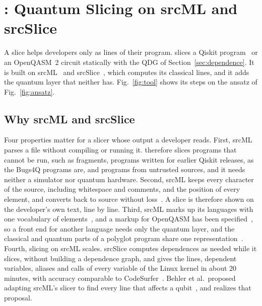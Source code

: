 \section{\tool: Quantum Slicing on srcML and srcSlice}\label{sec:tool}

A slice helps developers only as lines of their program. \tool{} slices a Qiskit
program~\cite{javadi2024qiskit} or an OpenQASM~2 circuit statically with the QDG of Section~\ref{sec:dependence}. It is built on
srcML~\cite{collard2011lightweight, collard2013srcml} and srcSlice~\cite{alomari2014srcslice}, which
computes its classical lines, and it adds the quantum layer that neither has. Fig.~\ref{fig:tool} shows its steps on the ansatz of
Fig.~\ref{fig:ansatz}.

\subsection{Why srcML and srcSlice}
Four properties matter for a slicer whose output a developer reads. First, srcML parses a file without
compiling or running it. \tool{} therefore slices programs that cannot be run, such as fragments, programs
written for earlier Qiskit releases, as the Bugs4Q programs are, and programs from untrusted sources, and
it needs neither a simulator nor quantum hardware. Second, srcML keeps every character of the source,
including whitespace and comments, and the position of every element, and converts back to source without
loss~\cite{collard2011lightweight, behler2024supporting}. A slice is therefore shown on the developer's own
text, line by line. Third, srcML marks up its languages with one vocabulary of
elements~\cite{collard2013srcml}, and a markup for OpenQASM has been
specified~\cite{behler2024supporting}, so a front end for another language needs only the quantum layer,
and the classical and quantum parts of a polyglot program share one representation~\cite{behler2025static}.
Fourth, slicing on srcML scales. srcSlice computes dependences as needed while it slices, without building
a dependence graph, and gives the lines, dependent variables, aliases and calls of every variable of the
Linux kernel in about 20 minutes, with accuracy comparable to CodeSurfer~\cite{alomari2014srcslice}.
Behler et al.\ proposed adapting srcML's slicer to find every line that affects a
qubit~\cite{behler2025static}, and \tool{} realizes that proposal.

